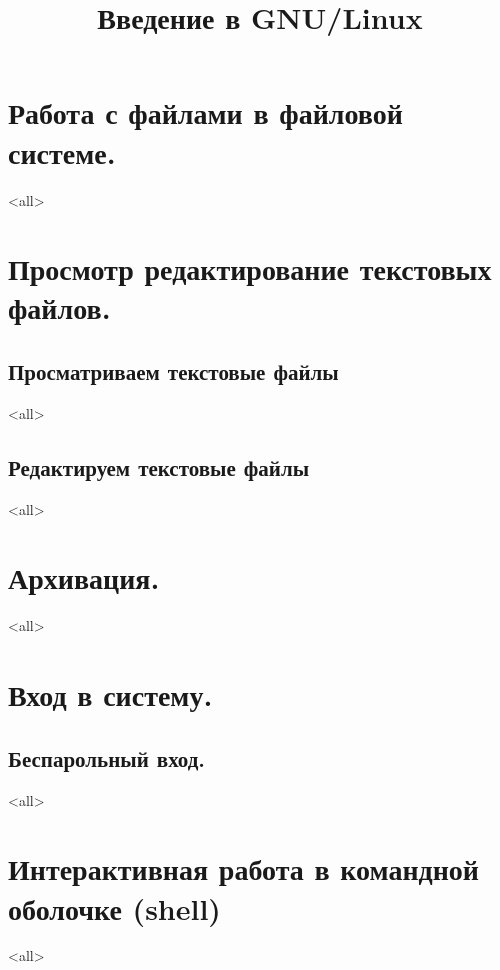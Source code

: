 

\title{Введение в GNU/Linux}




\begin{frame}
	\frametitle{}
	\titlepage
	\vspace{-0.5cm}
	\begin{center}
	\end{center}
\end{frame}


\begin{frame}
	\tableofcontents
	[hideallsubsections]
\end{frame}


\section{Работа с файлами в файловой системе.}
\mode<all>{}
\section{Просмотр редактирование текстовых файлов.}
\subsection{Просматриваем текстовые файлы}
\mode<all>{}
\subsection{Редактируем текстовые файлы}
\mode<all>{}
\section{Архивация.}
\mode<all>{}
\section{Вход в систему.}
\subsection{Беспарольный вход.}
\mode<all>{}
\section{Интерактивная работа в командной оболочке (shell)}
\mode<all>{}

\bye
